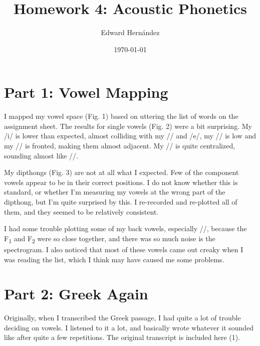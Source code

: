 \documentclass[doc,12pt]{apa6}
\begin{document}
\title{Homework 4: Acoustic Phonetics}
\author{Edward Hern\'{a}ndez}
\date{\today}
\maketitle

\section{Part 1: Vowel Mapping}

I mapped my vowel space (Fig. 1) based on uttering the list of words on the
assignment sheet. The results for single vowels (Fig. 2) were a bit surprising.
My /i/ is lower than expected, almost colliding with my // and /e/,
my // is low and my // is fronted, making them almost
adjacent.  My // is quite centralized, sounding almost like
//.

My dipthongs (Fig. 3) are not at all what I expected. Few of the component
vowels appear to be in their correct positions. I do not know whether this is
standard, or whether I'm measuring my vowels at the wrong part of the dipthong,
but I'm quite surprised by this. I re-recorded and re-plotted all of them, and
they seemed to be relatively consistent.

I had some trouble plotting some of my back vowels, especially //,
because the F\textsubscript{1} and F\textsubscript{2} were so close together,
and there was so much noise is the spectrogram. I also noticed that most of
these vowels came out creaky when I was reading the list, which I think may
have caused me some problems.

\section{Part 2: Greek Again}

Originally, when I transcribed the Greek passage, I had quite a lot of trouble
deciding on vowels. I listened to it a lot, and basically wrote whatever it
sounded like after quite a few repetitions. The original transcript is included
here (1).

\begin{exe}
	\ex {}
\end{exe}
\end{document}
